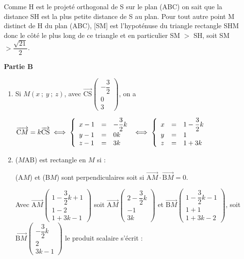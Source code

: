 \documentclass[10pt]{article}
\providecommand{\vect}[1]{\overrightarrow{#1}}
\begin{document}
\begin{enumerate}
\begin{enumerate}
Comme H est le projeté orthogonal de S sur le plan (ABC) on sait que la distance SH est la plus petite distance de S au plan. Pour tout autre point M distinct de H du plan (ABC), [SM] est l'hypoténuse du triangle rectangle SHM donc le côté le plus long de ce triangle et en particulier SM $> $ SH, soit SM $ > \dfrac{\sqrt{21}}{2}$.
	\end{enumerate}
\end{enumerate}

\medskip

\begin{center}\textbf{Partie B} \end{center}

\smallskip

\begin{enumerate}
\item Si $M(x~;~y~;~z)$, avec $\vect{\text{CS}}\begin{pmatrix}- \dfrac 32\\0\\3\end{pmatrix}$, on a 

$\vect{\text{C}M} = k\vect{\text{CS}} \iff \left\{\begin{array}{l c l}
x - 1&=&- \dfrac 32 k\\
y - 1&=&0k\\
z - 1&=&3k
\end{array}\right. \iff \left\{\begin{array}{l c l}
x &=& 1 - \dfrac 32 k\\
y &=&1\\
z &=&1 + 3k
\end{array}\right.$
	\item ($M$AB) est rectangle en $M$ si :
	
(A$M$) et (B$M$) sont perpendiculaires soit si $\vect{\text{A}M} \cdot \vect{\text{B}M} = 0$.

Avec $\vect{\text{A}M}\begin{pmatrix}1 - \dfrac 32 k + 1\\1 - 2\\1 + 3k - 1\end{pmatrix}$ soit $\vect{\text{A}M}\begin{pmatrix} 2 - \dfrac 32 k\\ - 1\\3k\end{pmatrix}$ et 
$\vect{\text{B}M}\begin{pmatrix}1 - \dfrac 32 k - 1\\1 + 1\\1 + 3k - 2\end{pmatrix}$, soit $\vect{\text{B}M}\begin{pmatrix}- \dfrac 32 k \\2\\3k - 1\end{pmatrix}$ le produit scalaire s'écrit :


\end{enumerate}
\end{document}
